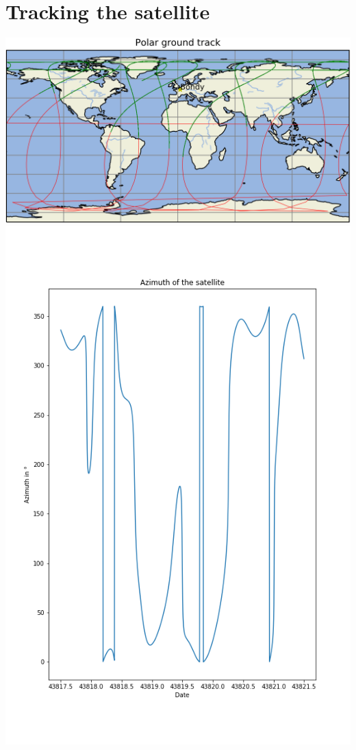 \documentclass[a4paper,12pt,calibri,oneside,openany]{book}
\theoremstyle{break}
\begin{document}
\chapter{Tracking the satellite}
\begin{center}
	\includegraphics[width=\linewidth]{groundtrack}\\
	\includegraphics[width=\linewidth]{azimuth}\\

\end{center}
\end{document}
